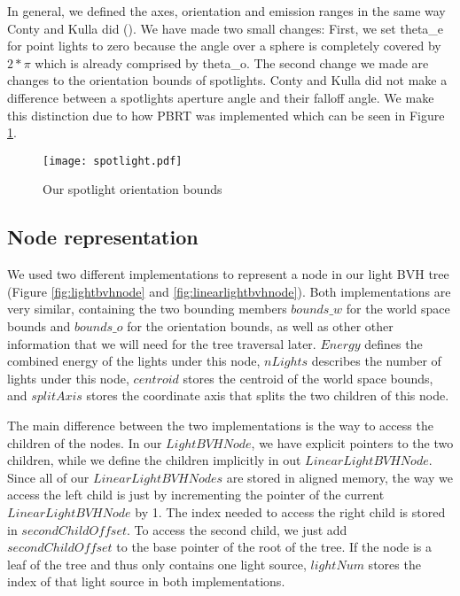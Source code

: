 In general, we defined the axes, orientation and emission ranges in the same way Conty and Kulla did (\Cite{MLS}). We have made two small changes: First, we set theta\_e for point lights to zero because the angle over a sphere is completely covered by $2 * \pi$ which is already comprised by theta\_o. The second change we made are changes to the orientation bounds of spotlights. Conty and Kulla did not make a difference between a spotlights aperture angle and their falloff angle. We make this distinction due to how PBRT was implemented which can be seen in Figure \ref{fig:spotlight}.

\begin{figure}
	\begin{center}
		\texttt{[image: spotlight.pdf]}
		\caption{Our spotlight orientation bounds}
		\label{fig:spotlight}
	\end{center}
\end{figure}

\subsection{Node representation}

We used two different implementations to represent a node in our light BVH tree (Figure \ref{fig:lightbvhnode} and \ref{fig:linearlightbvhnode}). Both implementations are very similar, containing the two bounding members $bounds\_w$ for the world space bounds and $bounds\_o$ for the orientation bounds, as well as other other information that we will need for the tree traversal later. $Energy$ defines the combined energy of the lights under this node, $nLights$ describes the number of lights under this node, $centroid$ stores the centroid of the world space bounds, and $splitAxis$ stores the coordinate axis that splits the two children of this node. 

The main difference between the two implementations is the way to access the children of the nodes. In our $LightBVHNode$, we have explicit pointers to the two children, while we define the children implicitly in out $LinearLightBVHNode$. Since all of our $LinearLightBVHNodes$ are stored in aligned memory, the way we access the left child is just by incrementing the pointer of the current $LinearLightBVHNode$ by 1. The index needed to access the right child is stored in $secondChildOffset$. To access the second child, we just add $secondChildOffset$ to the base pointer of the root of the tree. If the node is a leaf of the tree and thus only contains one light source, $lightNum$ stores the index of that light source in both implementations.

